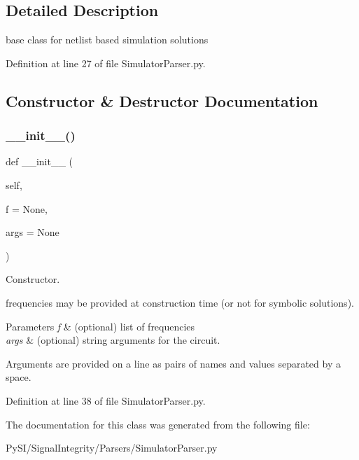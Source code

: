 \subsection{Detailed Description}
base class for netlist based simulation solutions 

Definition at line 27 of file Simulator\+Parser.\+py.



\subsection{Constructor \& Destructor Documentation}
\mbox{\label{classSignalIntegrity_1_1Parsers_1_1SimulatorParser_1_1SimulatorParser_af9856388f7022892c3159ad55872a27e}} 
\subsubsection{\texorpdfstring{\+\_\+\+\_\+init\+\_\+\+\_\+()}{\_\_init\_\_()}}
{\footnotesize\ttfamily def \+\_\+\+\_\+init\+\_\+\+\_\+ (\begin{DoxyParamCaption}\item[{}]{self,  }\item[{}]{f = {\ttfamily None},  }\item[{}]{args = {\ttfamily None} }\end{DoxyParamCaption})}



Constructor. 

frequencies may be provided at construction time (or not for symbolic solutions).


\begin{DoxyParams}{Parameters}
{\em f} & (optional) list of frequencies \\
\hline
{\em args} & (optional) string arguments for the circuit.\\
\hline
\end{DoxyParams}
Arguments are provided on a line as pairs of names and values separated by a space. 

Definition at line 38 of file Simulator\+Parser.\+py.



The documentation for this class was generated from the following file\+:\begin{DoxyCompactItemize}
\item 
Py\+S\+I/\+Signal\+Integrity/\+Parsers/Simulator\+Parser.\+py\end{DoxyCompactItemize}
